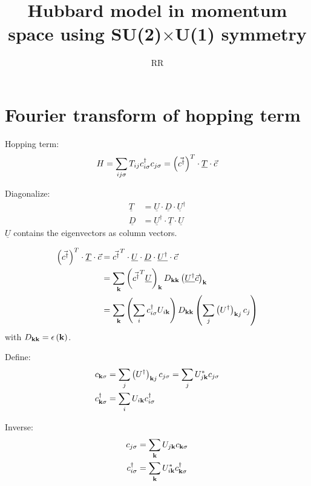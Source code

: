 \documentclass[12pt,paper=a4,BCOR=16mm]{article}
\title{Hubbard model in momentum space using SU(2)$\times$U(1) symmetry}
\author{RR}
\renewcommand{\c}[1]{c_{#1}}
\newcommand{\cdag}[1]{c^{\dagger}_{#1}}
\newcommand{\cs}[1]{c_{#1\sigma}}
\newcommand{\cdags}[1]{c^{\dagger}_{#1\sigma}}
\newcommand{\Udag}[0]{U^{\dagger}}
\begin{document}
\maketitle

\section{Fourier transform of hopping term}

Hopping term:
\begin{equation}
H = \sum_{ij\sigma} T_{ij} \cdags{i}\cs{j} = \lr{\vec{\cdag{}}}^{T} \cdot \underline{T} \cdot \vec{c}
\end{equation}

Diagonalize:
\begin{equation}
\begin{split}
\underline{T} &= \underline{U} \cdot \underline{D} \cdot \underline{U}^{\dagger}\\ 
\underline{D} &= \underline{U}^{\dagger} \cdot \underline{T} \cdot \underline{U}
\end{split}
\end{equation}
$\underline{U}$ contains the eigenvectors as column vectors.

\begin{equation}
\begin{split}
\lr{\vec{\cdag{}}}^{T} \cdot \underline{T} \cdot \vec{c} 
&= \vec{\cdag{}}^{T} \cdot \underline{U} \cdot \underline{D} \cdot \underline{\Udag} \cdot \vec{c}\\
&= \sum_{\v{k}} \lr{\vec{\cdag{}}^T \underline{U}}_{{\v{k}}} D_{{\v{k}}{\v{k}}} \lr{\underline{\Udag}\vec{c}}_{{\v{k}}}\\
&= \sum_{{\v{k}}} \lr{\sum_i \cdags{i} U_{i{\v{k}}}}  D_{{\v{k}}{\v{k}}} \lr{\sum_j \lr{\Udag}_{{\v{k}}j} \c{j}}
\end{split}
\end{equation}
with $D_{\mathbf{k}\mathbf{k}}=\epsilon\left(\mathbf{k}\right)$.

Define:
\begin{equation}
\begin{split}
\cs{\v{k}} &= \sum_j \lr{\Udag}_{{\v{k}}j} \cs{j} = \sum_j U^{*}_{j\v{k}} \cs{j}\\
\cdags{\v{k}} &= \sum_i U_{i\v{k}} \cdags{i}
\end{split}
\end{equation}

Inverse:
\begin{equation}
\begin{split}
\cs{j} &= \sum_{\v{k}} U_{j\v{k}} \cs{\v{k}}\\
\cdags{i} &= \sum_{\v{k}} U^*_{i\v{k}} \cdags{\v{k}}
\end{split}
\end{equation}
\end{document}
